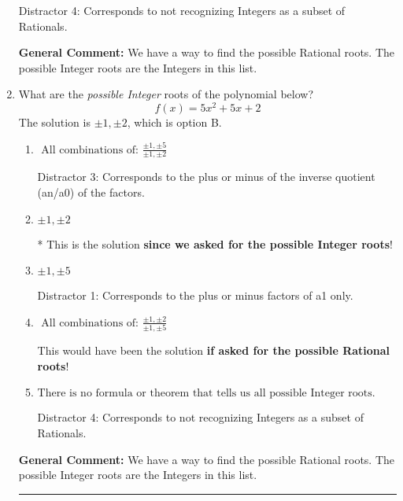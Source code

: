 \documentclass{extbook}[14pt]
\newcommand{\litem}[1]{\item #1

\rule{\textwidth}{0.4pt}}
\begin{document}
\begin{enumerate}
{\begin{enumerate}[label=\Alph*.]
 Distractor 4: Corresponds to not recognizing Integers as a subset of Rationals.
\end{enumerate}

\textbf{General Comment:} We have a way to find the possible Rational roots. The possible Integer roots are the Integers in this list.
}
\litem{
What are the \textit{possible Integer} roots of the polynomial below?
\[ f(x) = 5x^{2} +5 x + 2 \]The solution is \( \pm 1,\pm 2 \), which is option B.\begin{enumerate}[label=\Alph*.]
\item \( \text{ All combinations of: }\frac{\pm 1,\pm 5}{\pm 1,\pm 2} \)

 Distractor 3: Corresponds to the plus or minus of the inverse quotient (an/a0) of the factors. 
\item \( \pm 1,\pm 2 \)

* This is the solution \textbf{since we asked for the possible Integer roots}!
\item \( \pm 1,\pm 5 \)

 Distractor 1: Corresponds to the plus or minus factors of a1 only.
\item \( \text{ All combinations of: }\frac{\pm 1,\pm 2}{\pm 1,\pm 5} \)

This would have been the solution \textbf{if asked for the possible Rational roots}!
\item \( \text{There is no formula or theorem that tells us all possible Integer roots.} \)

 Distractor 4: Corresponds to not recognizing Integers as a subset of Rationals.
\end{enumerate}

\textbf{General Comment:} We have a way to find the possible Rational roots. The possible Integer roots are the Integers in this list.
}
\end{enumerate}
\end{document}

